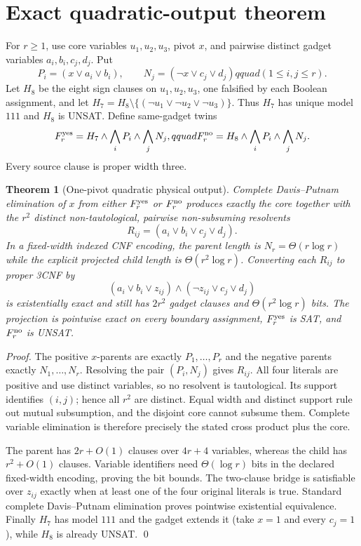 \documentclass[11pt]{article}
\newtheorem{theorem}{Theorem}
\begin{document}
\section{Exact quadratic-output theorem}
For $r\ge1$, use core variables $u_1,u_2,u_3$, pivot $x$, and pairwise
distinct gadget variables $a_i,b_i,c_j,d_j$.  Put
\[
 P_i=(x\vee a_i\vee b_i),\qquad
 N_j=(\neg x\vee c_j\vee d_j)qquad(1\le i,j\le r).
\]
Let $H_8$ be the eight sign clauses on $u_1,u_2,u_3$, one falsified by each
Boolean assignment, and let $H_7=H_8\setminus
\{(\neg u_1\vee\neg u_2\vee\neg u_3)\}$.  Thus $H_7$ has unique model
$111$ and $H_8$ is UNSAT.  Define same-gadget twins
\[
 F_r^{\rm yes}=H_7\wedge\bigwedge_iP_i\wedge\bigwedge_jN_j,qquad
 F_r^{\rm no}=H_8\wedge\bigwedge_iP_i\wedge\bigwedge_jN_j.
\]
Every source clause is proper width three.

\begin{theorem}[One-pivot quadratic physical output]
Complete Davis--Putnam elimination of $x$ from either $F_r^{\rm yes}$ or
$F_r^{\rm no}$ produces exactly the core together with the $r^2$ distinct
non-tautological, pairwise non-subsuming resolvents
\[
 R_{ij}=(a_i\vee b_i\vee c_j\vee d_j).
\]
In a fixed-width indexed CNF encoding, the parent length is
$N_r=\Theta(r\log r)$ while the explicit projected child length is
$\Theta(r^2\log r)$.  Converting each $R_{ij}$ to proper 3CNF by
\[
 (a_i\vee b_i\vee z_{ij})\wedge
 (\neg z_{ij}\vee c_j\vee d_j)
\]
is existentially exact and still has $2r^2$ gadget clauses and
$\Theta(r^2\log r)$ bits.  The projection is pointwise exact on every
boundary assignment, $F_r^{\rm yes}$ is SAT, and $F_r^{\rm no}$ is UNSAT.
\end{theorem}
\begin{proof}
The positive $x$-parents are exactly $P_1,\ldots,P_r$ and the negative
parents exactly $N_1,\ldots,N_r$.  Resolving the pair $(P_i,N_j)$ gives
$R_{ij}$.  All four literals are positive and use distinct variables, so no
resolvent is tautological.  Its support identifies $(i,j)$; hence all $r^2$
are distinct.  Equal width and distinct support rule out mutual subsumption,
and the disjoint core cannot subsume them.  Complete variable elimination is
therefore precisely the stated cross product plus the core.

The parent has $2r+O(1)$ clauses over $4r+4$ variables, whereas the child has
$r^2+O(1)$ clauses.  Variable identifiers need $\Theta(\log r)$ bits in the
declared fixed-width encoding, proving the bit bounds.  The two-clause bridge
is satisfiable over $z_{ij}$ exactly when at least one of the four original
literals is true.  Standard complete Davis--Putnam elimination proves
pointwise existential equivalence.  Finally $H_7$ has model $111$ and the
gadget extends it (take $x=1$ and every $c_j=1$), while $H_8$ is already
UNSAT.  \qed
\end{proof}
\end{document}
